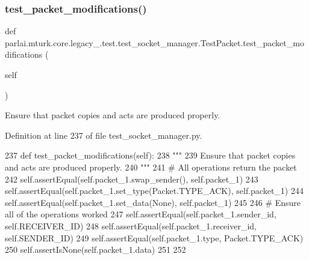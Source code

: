 \mbox{\label{classparlai_1_1mturk_1_1core_1_1legacy__2018_1_1test_1_1test__socket__manager_1_1TestPacket_a6d4934785401ca28058a93ec11b45612}} 
\subsubsection{\texorpdfstring{test\+\_\+packet\+\_\+modifications()}{test\_packet\_modifications()}}
{\footnotesize\ttfamily def parlai.\+mturk.\+core.\+legacy\+\_.\+test.\+test\+\_\+socket\+\_\+manager.\+Test\+Packet.\+test\+\_\+packet\+\_\+modifications (\begin{DoxyParamCaption}\item[{}]{self }\end{DoxyParamCaption})}

\begin{DoxyVerb}Ensure that packet copies and acts are produced properly.
\end{DoxyVerb}
 

Definition at line 237 of file test\+\_\+socket\+\_\+manager.\+py.


\begin{DoxyCode}
237     \textcolor{keyword}{def }test\_packet\_modifications(self):
238         \textcolor{stringliteral}{"""}
239 \textcolor{stringliteral}{        Ensure that packet copies and acts are produced properly.}
240 \textcolor{stringliteral}{        """}
241         \textcolor{comment}{# All operations return the packet}
242         self.assertEqual(self.packet\_1.swap\_sender(), self.packet\_1)
243         self.assertEqual(self.packet\_1.set\_type(Packet.TYPE\_ACK), self.packet\_1)
244         self.assertEqual(self.packet\_1.set\_data(\textcolor{keywordtype}{None}), self.packet\_1)
245 
246         \textcolor{comment}{# Ensure all of the operations worked}
247         self.assertEqual(self.packet\_1.sender\_id, self.RECEIVER\_ID)
248         self.assertEqual(self.packet\_1.receiver\_id, self.SENDER\_ID)
249         self.assertEqual(self.packet\_1.type, Packet.TYPE\_ACK)
250         self.assertIsNone(self.packet\_1.data)
251 
252 
\end{DoxyCode}



